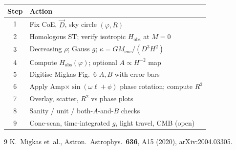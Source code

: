 \documentclass[11pt,a4paper]{article}
\begin{document}
\begin{center}
\renewcommand{\arraystretch}{1.25}
\begin{tabular}{@{}cl@{}}
\toprule
Step & Action \\
\midrule
1 & Fix CoE, \(\vec{D}\), sky circle \((\varphi,R)\) \\
2 & Homologous ST; verify isotropic \(H_{\mathrm{obs}}\) at \(M=0\) \\
3 & Decreasing \(\rho\); Gauss \(g\); \(\kappa=GM_{\mathrm{enc}}/(D^3H^2)\) \\
4 & Compute \(H_{\mathrm{obs}}(\varphi)\); optional \(A\propto H^{-2}\) map \\
5 & Digitise Migkas Fig.~6 \(A,B\) with error bars \\
6 & Apply Amp\(\times\sin(\omega\ell+\phi)\) phase rotation; compute \(R^2\) \\
7 & Overlay, scatter, \(R^2\) vs phase plots \\
8 & Sanity / unit / both-\(A\)-and-\(B\) checks \\
9 & Cone-scan, time-integrated \(g\), light travel, CMB (open) \\
\bottomrule
\end{tabular}
\end{center}

\begin{thebibliography}{9}
K.~Migkas et~al., Astron.\ Astrophys.\ \textbf{636}, A15 (2020), arXiv:2004.03305.
\end{thebibliography}
\end{document}
